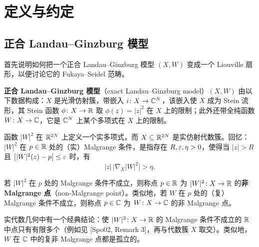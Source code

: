\section{定义与约定}

\subsection{正合 Landau--Ginzburg 模型}

首先说明如何把一个正合 Landau--Ginzburg 模型 $(X,W)$ 变成一个 Liouville 扇形，以便讨论它的 Fukaya--Seidel 范畴。

\begin{definition}\label{def:exact-lg}\label{def:2-1-1}
\textbf{正合 Landau--Ginzburg 模型}（exact Landau--Ginzburg model）$(X,W)$ 由以下数据构成：$X$ 是光滑仿射簇，带嵌入 $i\colon X\to\mathbb{C}^N$，该嵌入使 $X$ 成为 Stein 流形，其 Stein 函数 $\phi\colon X\to\mathbb{R}$ 取 $\phi(z)=|z|^2$ 在 $X$ 上的限制；此外还带全纯函数 $W\colon X\to\mathbb{C}$，它是 $\mathbb{C}^N$ 上某个多项式在 $X$ 上的限制。
\end{definition}


函数 $|W|^2$ 在 $\mathbb{R}^{2N}$ 上定义一个实多项式，而 $X\subseteq\mathbb{R}^{2N}$ 是实仿射代数簇。回忆：$|W|^2$ 在 $p\in\mathbb{R}$ 处的（实）Malgrange 条件，是指存在
$R,\varepsilon,\eta>0$，使得当 $|z|>R$ 且 $\bigl||W|^2(z)-p\bigr|\le\varepsilon$ 时，有
\[
|z|\,\bigl|\nabla_X|W|^2\bigr|>\eta.
\]


\begin{definition}\label{def:non-malgrange}\label{def:2-1-2}
若 $|W|^2$ 在 $p$ 处的 Malgrange 条件不成立，则称点 $p\in\mathbb{R}$ 为 $|W|^2\colon X\to\mathbb{R}$ 的\textbf{非 Malgrange 点}（non-Malgrange point）。类似地，若 $W$ 在 $p$ 处的（复）Malgrange 条件不成立，则称点 $p\in\mathbb{C}$ 为 $W\colon X\to\mathbb{C}$ 的非 Malgrange 点。
\end{definition}

实代数几何中有一个经典结论：使 $|W|^2\colon X\to\mathbb{R}$ 的 Malgrange 条件不成立的 $\mathbb{R}$ 中点只有有限多个（例如见 [Spo02, Remark 3]，再与代数簇 $X$ 取交）。类似地，$W$ 在 $\mathbb{C}$ 中的复非 Malgrange 点都是孤立的。

